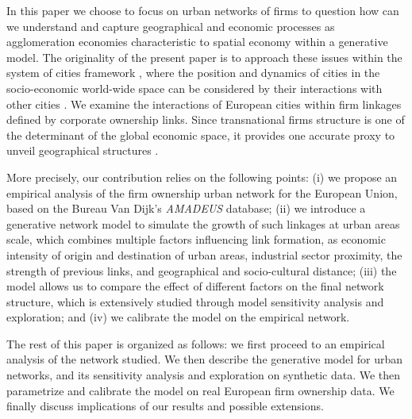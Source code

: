 \documentclass[11pt]{article}
\begin{document}

In this paper we choose to focus on urban networks of firms to question how can we understand and capture geographical and economic processes as agglomeration economies \cite{Glaeser2001} characteristic to spatial economy \cite{Fujitaetal2001} within a generative model. The originality of the present paper is to approach these issues within the system of cities framework \cite{berry1964cities}, where the position and dynamics of cities in the socio-economic world-wide space can be considered by their interactions with other cities \cite{pumain2018evolutionary}. We examine the interactions of European cities within firm linkages defined by corporate ownership links. Since transnational firms structure is one of the determinant of the global economic space, it provides one accurate proxy to unveil geographical structures \cite{2019arXiv191014652Z}. 

More precisely, our contribution relies on the following points: (i) we propose an empirical analysis of the firm ownership urban network for the European Union, based on the Bureau Van Dijk's \emph {AMADEUS} database; (ii) we introduce a generative network model to simulate the growth of such linkages at urban areas scale, which combines multiple factors influencing link formation, as economic intensity of origin and destination of urban areas, industrial sector proximity, the strength of previous links, and geographical and socio-cultural distance; (iii) the model allows us to compare the effect of different factors on the final network structure, which is extensively studied through model sensitivity analysis and exploration; and (iv) we calibrate the model on the empirical network.


The rest of this paper is organized as follows: we first proceed to an empirical analysis of the network studied. We then describe the generative model for urban networks, and its sensitivity analysis and exploration on synthetic data. We then parametrize and calibrate the model on real European firm ownership data. We finally discuss implications of our results and possible extensions.
\end{document}
